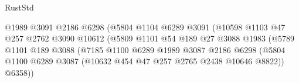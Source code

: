 \begin{lexlean}{RustStd}
\begin{coremodule}
                                            @1989
                                            @3091
                                            @2186
                                            @6298
                                            (@5804
                                              @1104
                                              @6289
                                              @3091
                                              (@10598
                                                @1103
                                                @47
                                                @257
                                                @2762
                                                @3090
                                                @10612
                                                (@5809
                                                  @1101
                                                  @54
                                                  @189
                                                  @27
                                                  @3088
                                                  @1983
                                                  (@5789
                                                    @1101
                                                    @189
                                                    @3088
                                                    (@7185
                                                      @1100
                                                      @6289
                                                      @1989
                                                      @3087
                                                      @2186
                                                      @6298
                                                      (@5804
                                                        @1100
                                                        @6289
                                                        @3087
                                                        (@10632
                                                          @454
                                                          @47
                                                          @257
                                                          @2765
                                                          @2438
                                                          @10646
                                                          @8822))
                                                      @6358))

\end{coremodule}
\end{lexlean}
